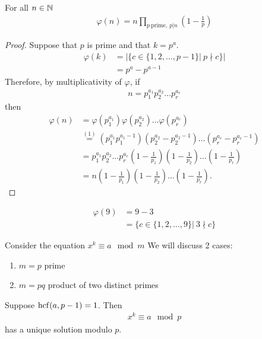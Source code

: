 \begin{pp}
	For all $n \in \mathbb N$
	\begin{align*}
	\varphi(n) = n \prod_{p ~\text{prime}, ~p | n} \left(1- \frac 1 p \right)
	\end{align*}
\end{pp}

\begin{proof}
Suppose that $p$ is prime and that $k=p^a$.
\begin{align*}
\varphi (k) & = |\{c \in \{1,2, \dots, p-1\}| ~ p \nmid c \} | \\
& = p^a - p^{a-1} \tag{1}
\end{align*}
Therefore, by multiplicativity of $\varphi$, if 
\begin{align*}
n = p_1^{a_1} p_2^{a_2} \dots p_r^{a_r} 
\end{align*}
then
\begin{align*}
	\varphi(n) & = \varphi \left(p_1^{a_1} \right) \varphi \left( p_2^{a_2} \right) \dots \varphi \left( p_r^{a_r} \right) \\
	& \overset{(1)}{=} \left( p_1^{a_1} p_1^{a_1-1} \right) \left(p_2^{a_2} - p_2^{a_2-1} \right) \dots \left(p_r^{a_r} - p_r^{a_r-1} \right) \\
	& = p_1^{a_1} p_2^{a_2} \dots p_r^{a_r} \left( 1 - \frac 1 {p_1} \right) \left( 1 - \frac 1 {p_2} \right) \dots \left( 1 - \frac 1 {p_r} \right) \\
	& = n \left( 1 - \frac 1 {p_1} \right) \left(1 - \frac 1 {p_2} \right) \dots \left( 1 - \frac 1 {p_r} \right)  .
\end{align*}
\end{proof}


\begin{ex}
	\begin{align*}
	\varphi(9) & = 9 - 3 \\
	& = \{ c \in \{ 1,2, \dots, 9 \} | ~ 3 \nmid c \}
	\end{align*}
\end{ex}
Consider the equation $x^k \equiv a \mod m$
We will discuss 2 cases:
\begin{enumerate}
	\item
	$m=p$ prime 
	\item
	$m = pq$ product of two distinct primes
\end{enumerate}

\begin{pp}
	Suppose $\operatorname{hcf}(a, p-1) = 1$. Then
	\begin{align*}
	x^k \equiv a \mod p  \tag{$*$}
	\end{align*}
	has a unique solution modulo $p$.
\end{pp}

